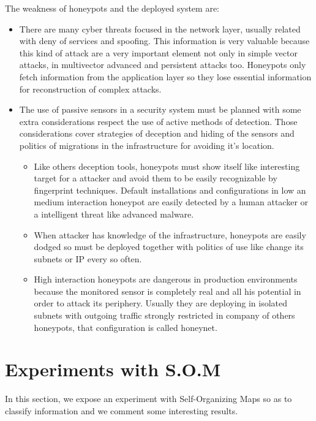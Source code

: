 \documentclass[a4paper]{llncs}
\begin{document}
The weakness of honeypots and the deployed system are:
\begin{itemize}
	\item There are many cyber threats focused in the network layer, usually related with deny of services and spoofing. This information is very valuable because this kind of attack are a very important element not only in simple vector attacks, in multivector advanced and persistent attacks too. Honeypots only fetch information from the application layer so they lose essential information for reconstruction of complex attacks.
	\item The use of passive sensors in a security system must be planned with some extra considerations respect the use of active methods of detection. Those considerations cover strategies of deception and hiding of the sensors and politics of migrations in the infrastructure for avoiding it's location.
	\begin{itemize}
		\item Like others deception tools, honeypots must show itself like interesting target for a attacker and avoid them to be easily recognizable by fingerprint techniques. Default installations and configurations in low an medium interaction honeypot are easily detected by a human attacker or a intelligent threat like advanced malware.
		\item When attacker has knowledge of the infrastructure, honeypots are easily dodged so must be deployed together with politics of use like change its subnets or IP every so often.
		\item High interaction honeypots are dangerous in production environments because the monitored sensor is completely real and all his potential in order to attack its periphery. Usually they are deploying in isolated subnets with outgoing traffic strongly restricted in company of others honeypots, that configuration is called honeynet.
	\end{itemize}
\end{itemize}

\section{Experiments with S.O.M}
\label{sec:Improve}
In this section, we expose an experiment with Self-Organizing Maps so as to classify information and we comment some interesting results.
\end{document}
